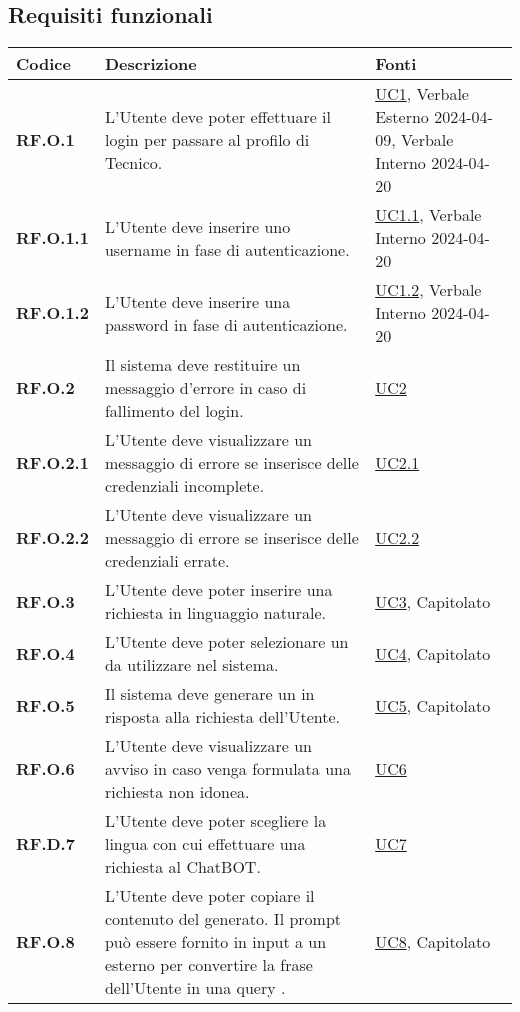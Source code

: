 \subsection{Requisiti funzionali}
\begin{longtable}{|P{3cm}|P{6,5cm}|>{\arraybackslash}P{4cm}|}
    \hline
    \textbf{Codice} & \textbf{Descrizione} & \textbf{Fonti} \\
    \hline
    \textbf{RF.O.1} & L'Utente deve poter effettuare il login per passare al profilo di Tecnico. & \hyperref[UC1]{UC1}, Verbale Esterno 2024-04-09, Verbale Interno 2024-04-20\\
    \hline
    \textbf{RF.O.1.1} & L'Utente deve inserire uno username in fase di autenticazione. & \hyperref[UC1point1]{UC1.1}, Verbale Interno 2024-04-20\\
    \hline
    \textbf{RF.O.1.2} & L'Utente deve inserire una password in fase di autenticazione. & \hyperref[UC1point2]{UC1.2}, Verbale Interno 2024-04-20\\
    \hline
    \textbf{RF.O.2} & Il sistema deve restituire un messaggio d'errore in caso di fallimento del login. & \hyperref[UC2]{UC2}\\
    \hline
    \textbf{RF.O.2.1} & L'Utente deve visualizzare un messaggio di errore se inserisce delle credenziali incomplete. & \hyperref[UC2point1]{UC2.1}\\
    \hline
    \textbf{RF.O.2.2} & L'Utente deve visualizzare un messaggio di errore se inserisce delle credenziali errate. & \hyperref[UC2point2]{UC2.2}\\
    \hline
    \textbf{RF.O.3} & L'Utente deve poter inserire una richiesta in linguaggio naturale. & \hyperref[UC3]{UC3}, Capitolato\\
    \hline
    \textbf{RF.O.4} & L'Utente deve poter selezionare un  da utilizzare nel sistema. & \hyperref[UC4]{UC4}, Capitolato\\
    \hline
    \textbf{RF.O.5} & Il sistema deve generare un  in risposta alla richiesta dell'Utente. & \hyperref[UC5]{UC5}, Capitolato\\
    \hline
    \textbf{RF.O.6} & L'Utente deve visualizzare un avviso in caso venga formulata una richiesta non idonea. & \hyperref[UC6]{UC6}\\
    \hline
    \textbf{RF.D.7} & L'Utente deve poter scegliere la lingua con cui effettuare una richiesta al ChatBOT. & \hyperref[UC7]{UC7}\\
    \hline
    \textbf{RF.O.8} & L'Utente deve poter copiare il contenuto del  generato. Il prompt può essere fornito in input a un  esterno per convertire la frase dell'Utente in una query . & \hyperref[UC8]{UC8}, Capitolato\\

\end{longtable}
